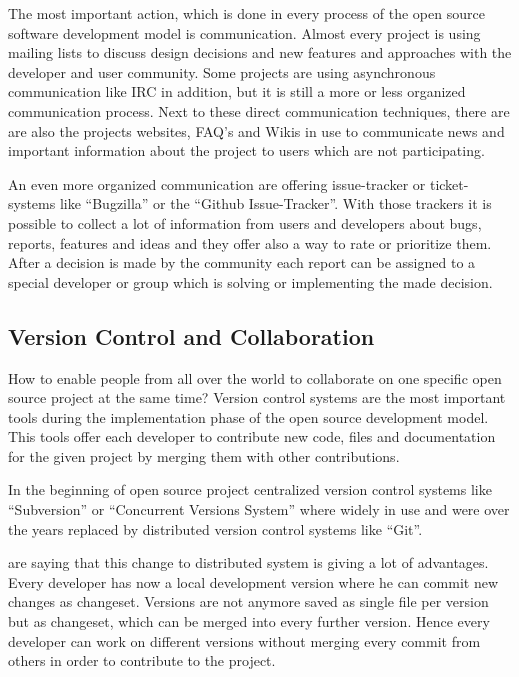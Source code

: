 \documentclass[DIV=calc,paper=a4,fontsize=9pt,twocolumn]{scrartcl}
\begin{document}
The most important action, which is done in every process of the open source software development model is communication. Almost every project is using mailing lists to discuss design decisions and new features and approaches with the developer and user community. Some projects are using asynchronous communication like IRC in addition, but it is still a more or less organized communication process. Next to these direct communication techniques, there are are also the projects websites, FAQ's and Wikis in use to communicate news and important information about the project to users which are not participating. \citep{ApacheFoundation13} 

An even more organized communication are offering issue-tracker or ticket-systems like \enquote{Bugzilla} or the \enquote{Github Issue-Tracker}. With those trackers it is possible to collect a lot of information from users and developers about bugs, reports, features and ideas and they offer also a way to rate or prioritize them. After a decision is made by the community each report can be assigned to a special developer or group which is solving or implementing the made decision.

\subsection{Version Control and Collaboration}

How to enable people from all over the world to collaborate on one specific open source project at the same time? Version control systems are the most important tools during the implementation phase of the open source development model. This tools offer each developer to contribute new code, files and documentation for the given project by merging them with other contributions. 

In the beginning of open source project centralized version control systems like \enquote{Subversion} or \enquote{Concurrent Versions System} where widely in use and were over the years replaced by distributed version control systems like \enquote{Git}. 

\citet{rodriguez2012distributed} are saying that this change to distributed system is giving a lot of advantages. Every developer has now a local development version where he can commit new changes as changeset. Versions are not anymore saved as single file per version but as changeset, which can be merged into every further version. Hence every developer can work on different versions without merging every commit from others in order to contribute to the project.
\end{document}
